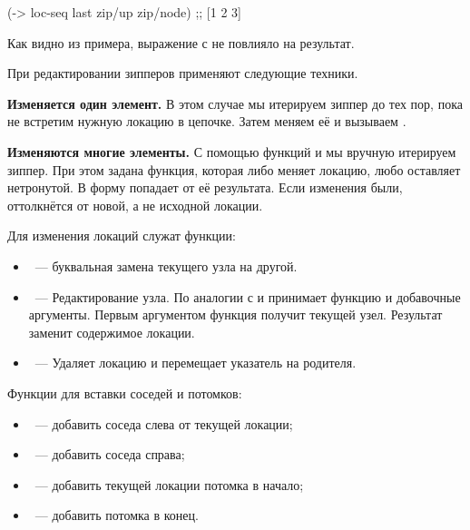 \begin{english}
  \begin{clojure}
(-> loc-seq last zip/up zip/node)
;; [1 2 3]
  \end{clojure}
\end{english}

Как видно из примера, выражение с  не повлияло на результат.

При редактировании зипперов применяют следующие техники.

\textbf{Изменяется один элемент.} В этом случае мы итерируем зиппер до тех пор, пока
не встретим нужную локацию в цепочке. Затем меняем её и вызываем .

\textbf{Изменяются многие элементы.} С помощью функций  и
 мы вручную итерируем зиппер. При этом задана функция, которая
либо меняет локацию, любо оставляет нетронутой. В форму  попадает
 от её результата. Если изменения были, 
оттолкнётся от новой, а не исходной локации.

Для изменения локаций служат функции:

\begin{itemize}

\item
  ~--- буквальная замена текущего узла на другой.

\item
  ~--- Редактирование узла. По аналогии с  и  принимает
  функцию и добавочные аргументы. Первым аргументом функция получит текущей
  узел. Результат заменит содержимое локации.

\item
  ~--- Удаляет локацию и перемещает указатель на родителя.

\end{itemize}

Функции для вставки соседей и потомков:

\begin{itemize}

\item
  ~--- добавить соседа слева от текущей локации;

\item
  ~--- добавить соседа справа;

\item
  ~--- добавить текущей локации потомка в начало;

\item
  ~--- добавить потомка в конец.

\end{itemize}

